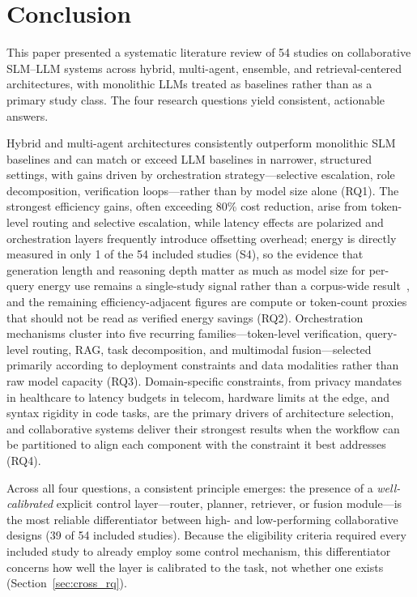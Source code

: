 \section{Conclusion}
\label{sec:conclusion}

This paper presented a systematic literature review of 54 studies on collaborative SLM--LLM systems across hybrid, multi-agent, ensemble, and retrieval-centered architectures, with monolithic LLMs treated as baselines rather than as a primary study class. The four research questions yield consistent, actionable answers.

Hybrid and multi-agent architectures consistently outperform monolithic SLM baselines and can match or exceed LLM baselines in narrower, structured settings, with gains driven by orchestration strategy---selective escalation, role decomposition, verification loops---rather than by model size alone (RQ1). The strongest efficiency gains, often exceeding 80\% cost reduction, arise from token-level routing and selective escalation, while latency effects are polarized and orchestration layers frequently introduce offsetting overhead; energy is directly measured in only 1 of the 54 included studies (S4), so the evidence that generation length and reasoning depth matter as much as model size for per-query energy use remains a single-study signal rather than a corpus-wide result~\cite{energytoken2025}, and the remaining efficiency-adjacent figures are compute or token-count proxies that should not be read as verified energy savings (RQ2). Orchestration mechanisms cluster into five recurring families---token-level verification, query-level routing, RAG, task decomposition, and multimodal fusion---selected primarily according to deployment constraints and data modalities rather than raw model capacity (RQ3). Domain-specific constraints, from privacy mandates in healthcare to latency budgets in telecom, hardware limits at the edge, and syntax rigidity in code tasks, are the primary drivers of architecture selection, and collaborative systems deliver their strongest results when the workflow can be partitioned to align each component with the constraint it best addresses (RQ4).

Across all four questions, a consistent principle emerges: the presence of a \emph{well-calibrated} explicit control layer---router, planner, retriever, or fusion module---is the most reliable differentiator between high- and low-performing collaborative designs (39 of 54 included studies). Because the eligibility criteria required every included study to already employ some control mechanism, this differentiator concerns how well the layer is calibrated to the task, not whether one exists (Section~\ref{sec:cross_rq}).

